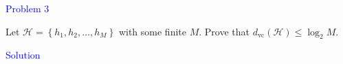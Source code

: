 \textcolor{blue}{Problem 3}

Let $\mathcal{H}=\left\{h_1, h_2, \ldots, h_M\right\}$ with some finite $M$. Prove that $d_{\mathrm{vc}}(\mathcal{H}) \leq \log _2 M$.

\textcolor{blue}{Solution}\\











\newpage